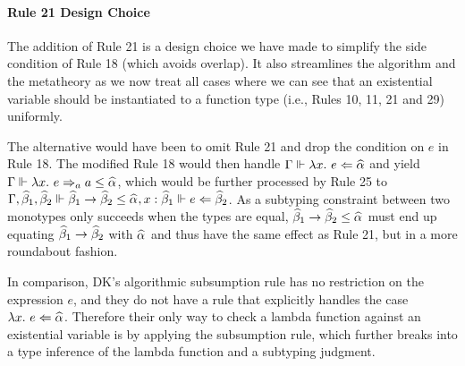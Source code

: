 \paragraph{Rule 21 Design Choice}
The addition of Rule 21 is a design choice we have made to simplify the side
condition of Rule 18 (which avoids overlap). It also streamlines the algorithm
and the metatheory as we now treat all cases
where we can see that an existential variable should be instantiated to a
function type  (i.e., Rules 10, 11, 21 and 29) uniformly.

The alternative would have been to omit Rule 21 and drop the condition on $e$
in Rule 18. The modified Rule 18 would then handle $\Gm \Vdash \lam e \Lto \al$
and yield $\Gm \Vdash \lam e \To_a a \le \al$, which would be further processed
by Rule 25 to $\Gm, \bt[1], \bt[2] \Vdash \bt[1] \to \bt[2] \le \al, x:\bt[1] \Vdash e \Lto \bt[2]$.
As a subtyping constraint between two monotypes only succeeds when the types are equal, $\bt[1] \to \bt[2] \le \al$
must end up equating $\bt[1] \to \bt[2]$ with $\al$ and thus have the same effect as Rule 21, but in a more roundabout
fashion.

In comparison,
DK's algorithmic subsumption rule has no restriction on the expression $e$,
and they do not have a rule that explicitly handles the case $\lam e \Lto \al$.
Therefore their only way to check a lambda function against an existential variable
is by applying the subsumption rule, which further breaks into
a type inference of the lambda function and a subtyping judgment.
% 

